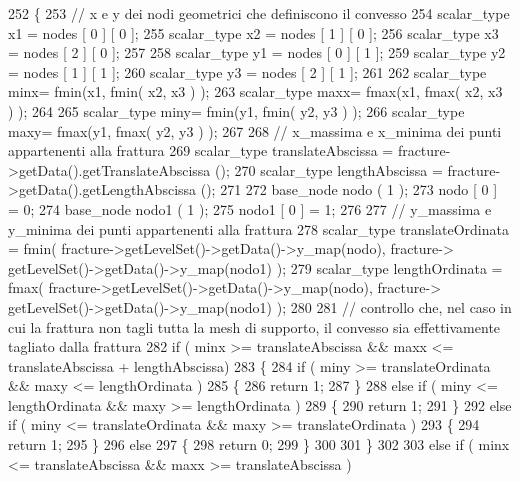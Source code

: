\begin{DoxyCode}
252 \{
253     \textcolor{comment}{// x e y dei nodi geometrici che definiscono il convesso}
254     scalar\_type x1 = nodes [ 0 ] [ 0 ];
255     scalar\_type x2 = nodes [ 1 ] [ 0 ];
256     scalar\_type x3 = nodes [ 2 ] [ 0 ];
257 
258     scalar\_type y1 = nodes [ 0 ] [ 1 ];
259     scalar\_type y2 = nodes [ 1 ] [ 1 ];
260     scalar\_type y3 = nodes [ 2 ] [ 1 ];
261 
262     scalar\_type minx= fmin(x1, fmin( x2, x3 ) );
263     scalar\_type maxx= fmax(x1, fmax( x2, x3 ) );
264 
265     scalar\_type miny= fmin(y1, fmin( y2, y3 ) );
266     scalar\_type maxy= fmax(y1, fmax( y2, y3 ) );
267 
268     \textcolor{comment}{// x\_massima e x\_minima dei punti appartenenti alla frattura}
269     scalar\_type translateAbscissa = fracture->getData().getTranslateAbscissa ();
270     scalar\_type lengthAbscissa = fracture->getData().getLengthAbscissa ();
271 
272     base\_node nodo ( 1 );
273     nodo [ 0 ] = 0;
274     base\_node nodo1 ( 1 );
275     nodo1 [ 0 ] = 1;
276     
277     \textcolor{comment}{// y\_massima e y\_minima dei punti appartenenti alla frattura}
278     scalar\_type translateOrdinata = fmin( fracture->getLevelSet()->getData()->y\_map(nodo), fracture->
      getLevelSet()->getData()->y\_map(nodo1) );
279     scalar\_type lengthOrdinata = fmax( fracture->getLevelSet()->getData()->y\_map(nodo), fracture->
      getLevelSet()->getData()->y\_map(nodo1) );
280     
281     \textcolor{comment}{// controllo che, nel caso in cui la frattura non tagli tutta la mesh di supporto, il convesso sia
       effettivamente tagliato dalla frattura}
282     \textcolor{keywordflow}{if} ( minx >= translateAbscissa && maxx <= translateAbscissa + lengthAbscissa)
283     \{   
284         \textcolor{keywordflow}{if} ( miny >= translateOrdinata && maxy <= lengthOrdinata )
285         \{   
286             \textcolor{keywordflow}{return} 1;
287         \}
288         \textcolor{keywordflow}{else} \textcolor{keywordflow}{if} ( miny <= lengthOrdinata && maxy >= lengthOrdinata )
289         \{   
290             \textcolor{keywordflow}{return} 1;
291         \}
292         \textcolor{keywordflow}{else} \textcolor{keywordflow}{if} ( miny <= translateOrdinata && maxy >= translateOrdinata )
293         \{   
294             \textcolor{keywordflow}{return} 1;
295         \}
296         \textcolor{keywordflow}{else}
297         \{   
298             \textcolor{keywordflow}{return} 0;
299         \}
300 
301     \}
302 
303     \textcolor{keywordflow}{else} \textcolor{keywordflow}{if} ( minx <= translateAbscissa && maxx >= translateAbscissa )

\end{DoxyCode}
